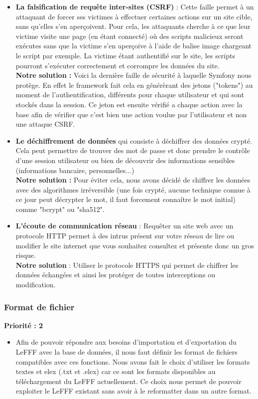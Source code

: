 \documentclass[12pt,a4paper]{article}
\begin{document}
\begin{itemize}
    \item \textbf{La falsification de requête inter-sites (CSRF)} : Cette faille permet à un attaquant de forcer ses victimes à effectuer certaines actions sur un site cible, sans qu'elles s'en aperçoivent. Pour cela, les attaquants cherche à ce que leur victime visite une page (en étant connecté) où des scripts malicieux seront exécutes sans que la victime s'en aperçoive à l'aide de balise image chargeant le script par exemple. La victime étant authentifié sur le site, les scripts pourront s'exécuter correctement et corrompre les données du site. \\
    \textbf{Notre solution :} Voici la dernière faille de sécurité à laquelle Symfony nous protège. En effet le framework fait cela en générèrant des jetons ("tokens") au moment de l'authentification, différents pour chaque utilisateur et qui sont stockés dans la session. Ce jeton est ensuite vérifié a chaque action avec la base afin de vérifier que c'est bien une action voulue par l'utilisateur et non une attaque CSRF. 
    
    \item \textbf{Le déchiffrement de données} qui consiste à déchiffrer des données crypté. Cela peut permettre de trouver des mot de passe et donc prendre le contrôle d'une session utilisateur ou bien de découvrir des informations sensibles (informations bancaire, personnelles...) \\
    \textbf{Notre solution :} Pour éviter cela, nous avons décidé de chiffrer les données avec des algorithmes irréversible (une fois crypté, aucune technique connue à ce jour peut décrypter le mot, il faut forcement connaître le mot initial) comme "bcrypt" ou "sha512".
    
    \item \textbf{L'écoute de communication réseau} : Requêter un site web avec un protocole HTTP permet à des intrus présent sur votre réseau de lire ou modifier le site internet que vous souhaitez consultez et présente donc un gros risque. \\
    \textbf{Notre solution} : Utiliser le protocole HTTPS qui permet de chiffrer les données échangées et ainsi les protéger de toutes interceptions ou modification.
\end{itemize}

\subsubsection{Format de fichier}
\textbf{Priorité : 2}
\smallbreak
\begin{itemize}
\item Afin de pouvoir répondre aux besoins d'importation et d'exportation du LeFFF avec la base de données, il nous faut définir les format de fichiers compatibles avec ces fonctions.
Nous avons fait le choix d'utiliser les formats textes et elex (.txt et .elex)  car ce sont les formats disponibles au téléchargement du LeFFF actuellement. Ce choix nous permet de pouvoir exploiter le LeFFF existant sans avoir à le reformatter dans un autre format.
\end{itemize}
\end{document}
